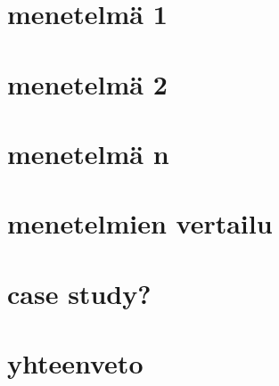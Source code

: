 \documentclass[finnish]{tktltiki2}
\theoremstyle{definition}
\theoremstyle{remark}
\begin{document}
\cite{chaudhuri1998}

\section{menetelmä 1}
\section{menetelmä 2}
\section{menetelmä n}
\section{menetelmien vertailu}
\section{case study?}
\section{yhteenveto}



%
%
% 
%



\end{document}
